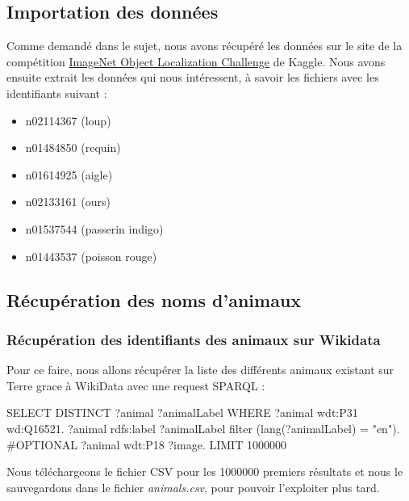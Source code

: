 


\subsection{Importation des données}

Comme demandé dans le sujet, nous avons récupéré les données sur le site de la compétition \href{https://www.kaggle.com/competitions/imagenet-object-localization-challenge}{ImageNet Object Localization Challenge} de Kaggle. Nous avons ensuite extrait les données qui nous intéressent, à savoir les fichiers avec les identifiants suivant :
\begin{itemize}
    \item n02114367 (loup)
    \item n01484850 (requin)
    \item n01614925 (aigle)
    \item n02133161 (ours)
    \item n01537544 (passerin indigo)
    \item n01443537 (poisson rouge)
\end{itemize}


\subsection{Récupération des noms d'animaux}

\subsubsection{Récupération des identifiants des animaux sur Wikidata}

Pour ce faire, nous allons récupérer la liste des différents animaux existant sur Terre grace à WikiData avec une request SPARQL :

\begin{paddingTab} 
    \begin{customFrame}
    SELECT DISTINCT ?animal ?animalLabel WHERE {
      ?animal wdt:P31 wd:Q16521.
      ?animal rdfs:label ?animalLabel filter (lang(?animalLabel) = "en").
      #OPTIONAL {?animal wdt:P18 ?image.}
    } LIMIT 1000000
    \end{customFrame}
\end{paddingTab}

Nous téléchargeons le fichier CSV pour les 1000000 premiers résultats et nous le sauvegardons dans le fichier \textit{animals.csv}, pour pouvoir l'exploiter plus tard.

